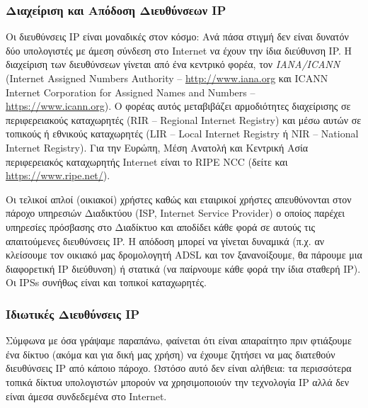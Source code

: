 \subsubsection*{Διαχείριση και Απόδοση Διευθύνσεων IP}

Οι διευθύνσεις IP είναι μοναδικές στον κόσμο: Ανά πάσα στιγμή δεν είναι δυνατόν δύο υπολογιστές με άμεση σύνδεση στο Internet να έχουν την ίδια διεύθυνση IP. Η διαχείριση των διευθύνσεων γίνεται από ένα κεντρικό φορέα, τον \emph{IANA/ICANN} (Internet Assigned Numbers Authority -- \url{http://www.iana.org} και ICANN Internet Corporation for Assigned Names and Numbers -- \url{https://www.icann.org}). Ο φορέας αυτός μεταβιβάζει αρμοδιότητες διαχείρισης σε περιφερειακούς καταχωρητές (RIR -- Regional Internet Registry) και μέσω αυτών σε τοπικούς ή εθνικούς καταχωρητές (LIR -- Local Internet Registry ή NIR -- National Internet Registry). Για την Ευρώπη, Μέση Ανατολή και Κεντρική Ασία περιφερειακός καταχωρητής Internet είναι το RIPE NCC (δείτε και \url{https://www.ripe.net/}).

Οι τελικοί απλοί (οικιακοί) χρήστες καθώς και εταιρικοί χρήστες απευθύνονται στον πάροχο υπηρεσιών Διαδικτύου (ISP, Internet Service Provider) ο οποίος παρέχει υπηρεσίες πρόσβασης στο Διαδίκτυο και αποδίδει κάθε φορά σε αυτούς τις απαιτούμενες διευθύνσεις IP. Η απόδοση μπορεί να γίνεται δυναμικά (π.χ. αν κλείσουμε τον οικιακό μας δρομολογητή ADSL και τον ξανανοίξουμε, θα πάρουμε μια διαφορετική IP διεύθυνση) ή στατικά (να παίρνουμε κάθε φορά την ίδια σταθερή IP). Οι IPSs συνήθως είναι και τοπικοί καταχωρητές.

\subsubsection*{Ιδιωτικές Διευθύνσεις IP}

Σύμφωνα με όσα γράψαμε παραπάνω, φαίνεται ότι είναι απαραίτητο πριν φτιάξουμε ένα δίκτυο (ακόμα και για δική μας χρήση) να έχουμε ζητήσει να μας διατεθούν διευθύνσεις IP από κάποιο πάροχο. Ωστόσο αυτό δεν είναι αλήθεια: τα περισσότερα τοπικά δίκτυα υπολογιστών μπορούν να χρησιμοποιούν την τεχνολογία IP αλλά δεν είναι άμεσα συνδεδεμένα στο Internet.

